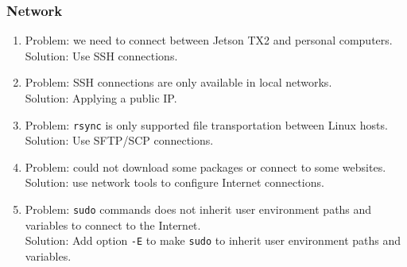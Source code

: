 \documentclass[a4paper]{article}
\begin{document}
\subsubsection{Network}
\begin{enumerate}
    \item Problem: we need to connect between Jetson TX2 and personal computers.\\
    Solution: Use SSH connections.
    \item Problem: SSH connections are only available in local networks.\\
    Solution: Applying a public IP.
    \item Problem: \texttt{rsync} is only supported file transportation between Linux hosts.\\
    Solution: Use SFTP/SCP connections.
    \item Problem: could not download some packages or connect to some websites.\\
    Solution: use network tools to configure Internet connections.
    \item Problem: \texttt{sudo} commands does not inherit user environment paths and variables to connect to the Internet.\\
    Solution: Add option \texttt{-E} to make \texttt{sudo} to inherit user environment paths and variables.
\end{enumerate}
\end{document}
